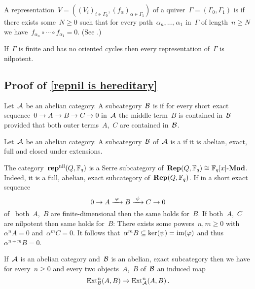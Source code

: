 \documentclass[a4paper,11pt]{scrartcl}
\begin{document}
A representation~$V = ((V_i)_{i \in \Gamma_0}, (f_\alpha)_{\alpha \in \Gamma_1})$ of a quiver~$\Gamma = (\Gamma_0, \Gamma_1)$ is  if there exists some~$N \geq 0$ such that for every path~$\alpha_n, \dotsc, \alpha_1$ in~$\Gamma$ of length~$n \geq N$ we have~$f_{\alpha_n} \circ \dotsb \circ f_{\alpha_1} = 0$.
(See \cite[Definition~4.4]{quiver_reps_F1}.)

If~$\Gamma$ is finite and has no oriented cycles then every representation of~$\Gamma$ is nilpotent.



\subsection{Proof of \cref{repnil is hereditary}}
\label{proof of repnil is hereditary}

\begin{definition}
  Let~$\mathcal{A}$ be an abelian category.
  A subcategory~$\mathcal{B}$ is  if for every short exact sequence~$0 \to A \to B \to C \to 0$ in~$\mathcal{A}$ the middle term~$B$ is contained in~$\mathcal{B}$ provided that both outer terms~$A$,~$C$ are contained in~$\mathcal{B}$.
\end{definition}

\begin{definition}
  Let~$\mathcal{A}$ be an abelian category.
  A subcategory~$\mathcal{B}$ of~$\mathcal{A}$ is a  if it is abelian, exact, full and closed under extensions.
\end{definition}

\begin{example}
  \label{repnil is a serre subcategory}
  The category~$\mathbf{rep}^{\mathrm{nil}}(Q, \mathbb{F}_q)$ is a Serre subcategory of~$\mathbf{Rep}(Q, \mathbb{F}_q) \cong \mathbb{F}_q[x]\textrm{-}\mathbf{Mod}$.
  Indeed, it is a full, abelian, exact subcategory of~$\mathbf{Rep}(Q, \mathbb{F}_q)$.
  If in a short exact sequence
  \[
    0
    \to
    A
    \xrightarrow{\; \varphi \;}
    B
    \xrightarrow{\; \psi \;}
    C
    \to
    0
  \]
  of~ both~$A$,~$B$ are finite-dimensional then the same holds for~$B$.
  If both~$A$,~$C$ are nilpotent then same holds for~$B$:
  There exists some powers~$n, m \geq 0$ with~$\alpha^n A = 0$ and~$\alpha^m C = 0$.
  It follows that~$\alpha^m B \subseteq \ker(\psi) = \operatorname{im}(\varphi)$ and thus~$\alpha^{n+m} B = 0$.
\end{example}

If~$\mathcal{A}$ is an abelian category and~$\mathcal{B}$ is an abelian, exact subcategory then we have for every~$n \geq 0$ and every two objects~$A$,~$B$ of~$\mathcal{B}$ an induced map
\[
  \operatorname{Ext}^n_{\mathcal{B}}(A,B)
  \to
  \operatorname{Ext}^n_{\mathcal{A}}(A,B) \,.
\]
\end{document}
